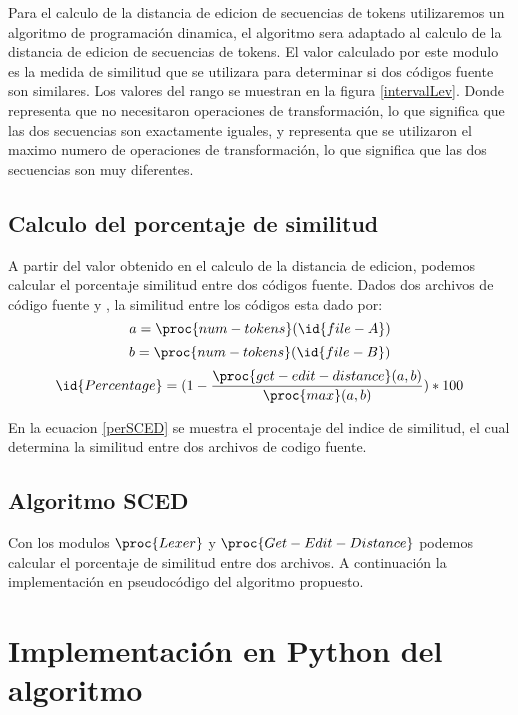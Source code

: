 Para el calculo de la distancia de edicion de secuencias de tokens utilizaremos un algoritmo de programación dinamica, el algoritmo sera adaptado al calculo de la distancia de edicion de secuencias de tokens. El valor calculado por este modulo es la medida de similitud que se utilizara para determinar si dos códigos fuente son similares. Los valores del rango se muestran en la figura \ref{intervalLev}. Donde  representa que no necesitaron operaciones de transformación, lo que significa que las dos secuencias son exactamente iguales, y  representa que se utilizaron el maximo numero de operaciones de transformación, lo que significa que las dos secuencias son muy diferentes.



\subsection{Calculo del porcentaje de similitud}
A partir del valor obtenido en el calculo de la distancia de edicion, podemos calcular el porcentaje similitud entre dos códigos fuente. Dados dos archivos de código fuente  y , la similitud entre los códigos esta dado por:
\begin{equation*}
a = \proc{num-tokens}(\id{file-A})
\end{equation*}
\begin{equation*}
b = \proc{num-tokens}(\id{file-B})
\end{equation*}
\begin{equation}
\id{Percentage} = (1 - \frac{\proc{get-edit-distance}(a, b)}{\proc{max}(a, b)}) * 100
\label{perSCED}
\end{equation}

En la ecuacion \ref{perSCED} se muestra el procentaje del indice de similitud, el cual determina la similitud entre dos archivos de codigo fuente.

\subsection{Algoritmo SCED}
Con los modulos $\proc{Lexer}$ y $\proc{Get-Edit-Distance}$ podemos calcular el porcentaje de similitud entre dos archivos. A continuación la implementación en pseudocódigo del algoritmo propuesto.



\section{Implementación en Python del algoritmo}
